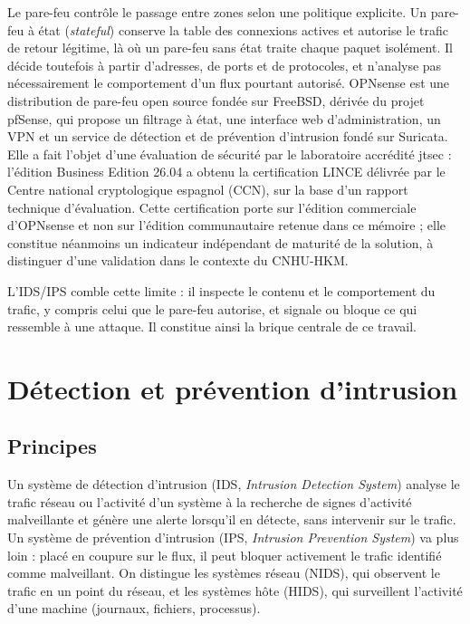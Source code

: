 Le pare-feu contrôle le passage entre zones selon une politique explicite. Un pare-feu à état (\emph{stateful}) conserve la table des connexions actives et autorise le trafic de retour légitime, là où un pare-feu sans état traite chaque paquet isolément\cite{nist80041}. Il décide toutefois à partir d'adresses, de ports et de protocoles, et n'analyse pas nécessairement le comportement d'un flux pourtant autorisé. OPNsense est une distribution de pare-feu open source fondée sur FreeBSD, dérivée du projet pfSense, qui propose un filtrage à état, une interface web d'administration, un VPN et un service de détection et de prévention d'intrusion fondé sur Suricata\cite{opnsensedoc}. Elle a fait l'objet d'une évaluation de sécurité par le laboratoire accrédité jtsec : l'édition Business Edition 26.04 a obtenu la certification LINCE délivrée par le Centre national cryptologique espagnol (CCN), sur la base d'un rapport technique d'évaluation\cite{jtsec}. Cette certification porte sur l'édition commerciale d'OPNsense et non sur l'édition communautaire retenue dans ce mémoire ; elle constitue néanmoins un indicateur indépendant de maturité de la solution, à distinguer d'une validation dans le contexte du CNHU-HKM.

L'IDS/IPS comble cette limite : il inspecte le contenu et le comportement du trafic, y compris celui que le pare-feu autorise, et signale ou bloque ce qui ressemble à une attaque. Il constitue ainsi la brique centrale de ce travail.

\section{Détection et prévention d'intrusion}

\subsection{Principes}

Un système de détection d'intrusion (IDS, \emph{Intrusion Detection System}) analyse le trafic réseau ou l'activité d'un système à la recherche de signes d'activité malveillante et génère une alerte lorsqu'il en détecte, sans intervenir sur le trafic. Un système de prévention d'intrusion (IPS, \emph{Intrusion Prevention System}) va plus loin : placé en coupure sur le flux, il peut bloquer activement le trafic identifié comme malveillant\cite{nist80094}. On distingue les systèmes réseau (NIDS), qui observent le trafic en un point du réseau, et les systèmes hôte (HIDS), qui surveillent l'activité d'une machine (journaux, fichiers, processus).

